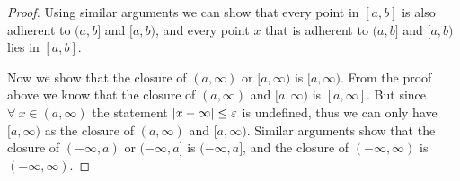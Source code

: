 \begin{proof}
    Using similar arguments we can show that every point in \([a, b]\) is also adherent to \((a, b]\) and \([a, b)\), and every point \(x\) that is adherent to \((a, b]\) and \([a, b)\) lies in \([a, b]\).

    Now we show that the closure of \((a, \infty)\) or \([a, \infty)\) is \([a, \infty)\).
    From the proof above we know that the closure of \((a, \infty)\) and \([a, \infty)\) is \([a, \infty]\).
    But since \(\forall\ x \in (a, \infty)\) the statement \(\abs*{x - \infty} \leq \varepsilon\) is undefined, thus we can only have \([a, \infty)\) as the closure of \((a, \infty)\) and \([a, \infty)\).
                    Similar arguments show that the closure of \((-\infty, a)\) or \((-\infty, a]\) is \((-\infty, a]\), and the closure of \((-\infty, \infty)\) is \((-\infty, \infty)\).
\end{proof}